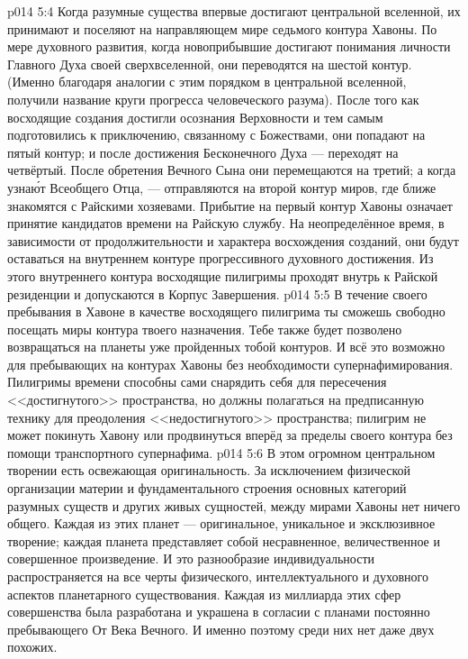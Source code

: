 \vs p014 5:4 \pc Когда разумные существа впервые достигают центральной вселенной, их принимают и поселяют на направляющем мире седьмого контура Хавоны. По мере духовного развития, когда новоприбывшие достигают понимания личности Главного Духа своей сверхвселенной, они переводятся на шестой контур. (Именно благодаря аналогии с этим порядком в центральной вселенной, получили название круги прогресса человеческого разума). После того как восходящие создания достигли осознания Верховности и тем самым подготовились к приключению, связанному с Божествами, они попадают на пятый контур; и после достижения Бесконечного Духа --- переходят на четвёртый. После обретения Вечного Сына они перемещаются на третий; а когда узна\'ют Всеобщего Отца, --- отправляются на второй контур миров, где ближе знакомятся с Райскими хозяевами. Прибытие на первый контур Хавоны означает принятие кандидатов времени на Райскую службу. На неопределённое время, в зависимости от продолжительности и характера восхождения созданий, они будут оставаться на внутреннем контуре прогрессивного духовного достижения. Из этого внутреннего контура восходящие пилигримы проходят внутрь к Райской резиденции и допускаются в Корпус Завершения.
\vs p014 5:5 В течение своего пребывания в Хавоне в качестве восходящего пилигрима ты сможешь свободно посещать миры контура твоего назначения. Тебе также будет позволено возвращаться на планеты уже пройденных тобой контуров. И всё это возможно для пребывающих на контурах Хавоны без необходимости супернафимирования. Пилигримы времени способны сами снарядить себя для пересечения <<достигнутого>> пространства, но должны полагаться на предписанную технику для преодоления <<недостигнутого>> пространства; пилигрим не может покинуть Хавону или продвинуться вперёд за пределы своего контура без помощи транспортного супернафима.
\vs p014 5:6 \pc В этом огромном центральном творении есть освежающая оригинальность. За исключением физической организации материи и фундаментального строения основных категорий разумных существ и других живых сущностей, между мирами Хавоны нет ничего общего. Каждая из этих планет --- оригинальное, уникальное и эксклюзивное творение; каждая планета представляет собой несравненное, величественное и совершенное произведение. И это разнообразие индивидуальности распространяется на все черты физического, интеллектуального и духовного аспектов планетарного существования. Каждая из миллиарда этих сфер совершенства была разработана и украшена в согласии с планами постоянно пребывающего От Века Вечного. И именно поэтому среди них нет даже двух похожих.
